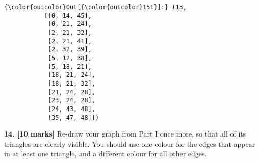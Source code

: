 \documentclass[11pt]{article}
\begin{document}
\begin{Verbatim}[commandchars=\\\{\}]
{\color{outcolor}Out[{\color{outcolor}151}]:} (13,
           [[0, 14, 45],
            [0, 21, 24],
            [2, 21, 32],
            [2, 21, 41],
            [2, 32, 39],
            [5, 12, 38],
            [5, 18, 21],
            [18, 21, 24],
            [18, 21, 32],
            [21, 24, 28],
            [23, 24, 28],
            [24, 43, 48],
            [35, 47, 48]])
\end{Verbatim}
            
    \textbf{14. {[}10 marks{]}} Re-draw your graph from Part I once more, so
that all of its triangles are clearly visible. You should use one colour
for the edges that appear in at least one triangle, and a different
colour for all other edges.
\end{document}
